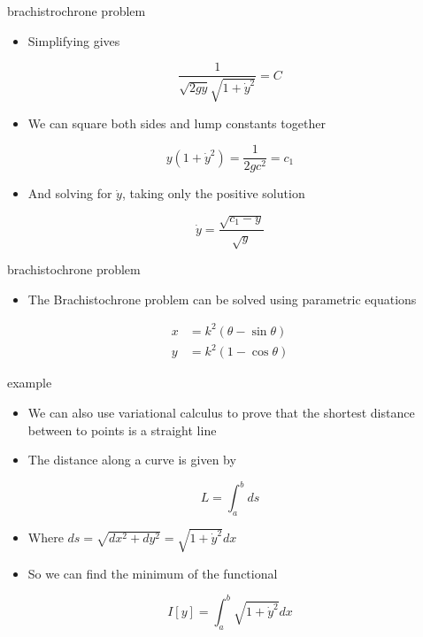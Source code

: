 \documentclass[
  letterpaper,
  ignorenonframetext,
  aspectratio=43,
  handout,
  12pt]{beamer}
\providecommand{\tightlist}{%
  \setlength{\itemsep}{0pt}\setlength{\parskip}{0pt}}
\providecommand{\tightlist}{%
\setlength{\itemsep}{0pt}\setlength{\parskip}{0pt}}
\begin{document}
\begin{frame}{brachistrochrone problem}
\protect\hypertarget{brachistrochrone-problem}{}
\begin{itemize}
\tightlist
\item
  Simplifying gives
\end{itemize}

\[\frac{1}{\sqrt{2 g y}\sqrt{1 + \dot{y}^2}} = C\]

\begin{itemize}
\tightlist
\item
  We can square both sides and lump constants together
\end{itemize}

\[y(1+\dot{y}^2) = \frac{1}{2gc^2} = c_1\]

\begin{itemize}
\tightlist
\item
  And solving for \(\dot{y}\), taking only the positive solution
\end{itemize}

\[\dot{y} = \frac{\sqrt{c_1-y}}{\sqrt{y}}\]
\end{frame}

\begin{frame}{brachistochrone problem}
\protect\hypertarget{brachistochrone-problem-2}{}
\begin{itemize}
\tightlist
\item
  The Brachistochrone problem can be solved using parametric equations
\end{itemize}

\[\begin{aligned}
  x &= k^2 (\theta - \sin\theta)\\
  y &= k^2 (1-\cos\theta)
\end{aligned}\]
\end{frame}

\begin{frame}{example}
\protect\hypertarget{example-1}{}
\begin{itemize}
\tightlist
\item
  We can also use variational calculus to prove that the shortest
  distance between to points is a straight line
\item
  The distance along a curve is given by
\end{itemize}

\[L = \int_a^b ds\]

\begin{itemize}
\tightlist
\item
  Where \(ds = \sqrt{dx^2 + dy^2} = \sqrt{1+ \dot{y}^2}dx\)
\item
  So we can find the minimum of the functional
\end{itemize}

\[I[y] = \int_a^b \sqrt{1+ \dot{y}^2}dx\]
\end{frame}
\end{document}
